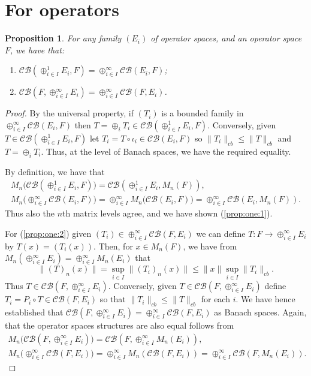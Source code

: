 \documentclass[a4paper,11pt]{article}
\theoremstyle{plain}
\newtheorem{proposition}{Proposition}[section]
\theoremstyle{definition}
\newcommand{\mc}[1]{\mathcal{#1}}
\begin{document}
\section{For operators}

\begin{proposition}\label{prop:one}
For any family $(E_i)$ of operator spaces, and an operator space $F$, we have that:
\begin{enumerate}
\item\label{prop:one:1}
$\mc{CB}(\oplus_{i\in I}^1 E_i, F) = \oplus_{i\in I}^\infty\mc{CB}(E_i,F)$;
\item\label{prop:one:2}
$\mc{CB}(F, \oplus_{i\in I}^\infty E_i) = \oplus_{i\in I}^\infty \mc{CB}(F,E_i)$.
\end{enumerate}
\end{proposition}
\begin{proof}
By the universal property, if $(T_i)$ is a bounded family in $\oplus_{i\in I}^\infty
\mc{CB}(E_i,F)$ then $T = \oplus_i T_i \in \mc{CB}(\oplus_{i\in I}^1 E_i, F)$.
Conversely, given $T\in \mc{CB}(\oplus_{i\in I}^1 E_i, F)$ let $T_i = T \circ \iota_i
\in\mc{CB}(E_i,F)$ so $\|T_i\|_{cb} \leq \|T\|_{cb}$ and $T = \oplus_i T_i$.  Thus,
at the level of Banach spaces, we have the required equality.

By definition, we have that
\begin{gather*}
M_n\big( \mc{CB}(\oplus_{i\in I}^1 E_i, F) \big)
= \mc{CB}(\oplus_{i\in I}^1 E_i, M_n(F)), \\
M_n\Big( \oplus_{i\in I}^\infty\mc{CB}(E_i,F) \Big)
= \oplus_{i\in I}^\infty M_n\big(\mc{CB}(E_i,F)\big)
= \oplus_{i\in I}^\infty\mc{CB}(E_i,M_n(F)).
\end{gather*}
Thus also the $n$th matrix levels agree, and we have shown (\ref{prop:one:1}).

For (\ref{prop:one:2}) given $(T_i) \in \oplus_{i\in I}^\infty \mc{CB}(F,E_i)$ we
can define $T:F\rightarrow \oplus_{i\in I}^\infty E_i$ by $T(x) = (T_i(x))$.  Then,
for $x\in M_n(F)$, we have from $M_n(\oplus_{i\in I}^\infty E_i)
= \oplus_{i\in I}^\infty M_n(E_i)$ that
\[ \|(T)_n(x)\| = \sup_{i\in I} \| (T_i)_n(x) \|
\leq \|x\| \sup_{i\in I} \|T_i\|_{cb}. \]
Thus $T\in \mc{CB}(F, \oplus_{i\in I}^\infty E_i)$.  Conversely, given
$T\in \mc{CB}(F, \oplus_{i\in I}^\infty E_i)$ define $T_i = P_i\circ T \in
\mc{CB}(F,E_i)$ so that $\|T_i\|_{cb}\leq \|T\|_{cb}$ for each $i$.  We have hence
established that $\mc{CB}(F, \oplus_{i\in I}^\infty E_i) =
\oplus_{i\in I}^\infty \mc{CB}(F,E_i)$ as Banach spaces.  Again, that the operator spaces
structures are also equal follows from
\begin{gather*}
M_n\big( \mc{CB}(F, \oplus_{i\in I}^\infty E_i) \big)
= \mc{CB}(F, \oplus_{i\in I}^\infty M_n(E_i)), \\
M_n\big( \oplus_{i\in I}^\infty \mc{CB}(F,E_i) \big)
= \oplus_{i\in I}^\infty M_n(\mc{CB}(F,E_i))
= \oplus_{i\in I}^\infty \mc{CB}(F,M_n(E_i)).
\end{gather*}
\end{proof}
\end{document}
